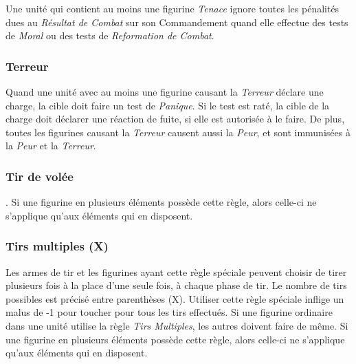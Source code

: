 Une unité qui contient au moins une figurine \emph{Tenace} ignore toutes les pénalités dues au \emph{Résultat de Combat} sur son Commandement quand elle effectue des tests de \emph{Moral} ou des tests de \emph{Reformation de Combat}.

\subsubsection*{Terreur}

Quand une unité avec au moins une figurine causant la \emph{Terreur} déclare une charge, la cible doit faire un test de \emph{Panique}. Si le test est raté, la cible de la charge doit déclarer une réaction de fuite, si elle est autorisée à le faire. De plus, toutes les figurines causant la \emph{Terreur} causent aussi la \emph{Peur}, et sont immunisées à la \emph{Peur} et la \emph{Terreur}.

\subsubsection*{Tir de volée}


. Si une figurine en plusieurs éléments possède cette règle, alors celle-ci ne s'applique qu'aux éléments qui en disposent.

\subsubsection*{Tirs multiples (X)}

Les armes de tir et les figurines ayant cette règle spéciale peuvent choisir de tirer plusieurs fois à la place d'une seule fois, à chaque phase de tir. Le nombre de tirs possibles est précisé entre parenthèses (X). Utiliser cette règle spéciale inflige un malus de -1 pour toucher pour tous les tirs effectués. Si une figurine ordinaire dans une unité utilise la règle \emph{Tirs Multiples}, les autres doivent faire de même. Si une figurine en plusieurs éléments possède cette règle, alors celle-ci ne s'applique qu'aux éléments qui en disposent.

